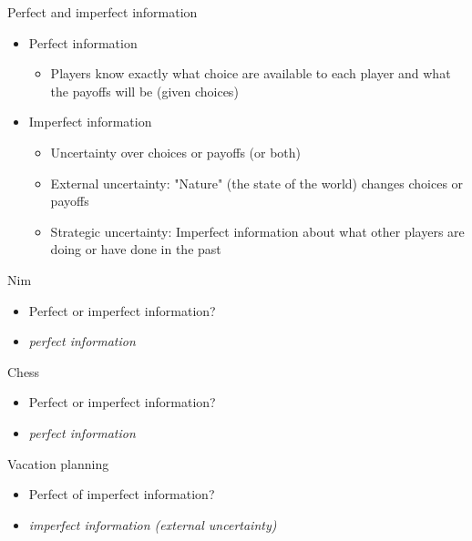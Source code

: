 \documentclass[10pt]{beamer}
\begin{document}
\begin{frame}[label={sec:orga606763}]{}
\alert{Perfect and imperfect information}
\begin{itemize}
\item Perfect information
\begin{itemize}
\item Players know exactly what choice are available to each player and what the payoffs will be (given choices)
\end{itemize}
\item Imperfect information
\begin{itemize}
\item Uncertainty over choices or payoffs (or both)
\item External uncertainty: "Nature" (the state of the world) changes choices or payoffs
\item Strategic uncertainty: Imperfect information about what other players are doing or have done in the past
\end{itemize}
\end{itemize}
\end{frame}

\begin{frame}[label={sec:org8154b02}]{}
\alert{Nim}
\begin{itemize}
\item Perfect or imperfect information?
\end{itemize}
\begin{itemize}
\item \emph{perfect information}
\end{itemize}
\end{frame}

\begin{frame}[label={sec:org79aff5f}]{}
\alert{Chess}
\begin{itemize}
\item Perfect or imperfect information?
\end{itemize}
\begin{itemize}
\item \emph{perfect information}
\end{itemize}
\end{frame}

\begin{frame}[label={sec:org02f0b6d}]{}
\alert{Vacation planning}
\begin{itemize}
\item Perfect of imperfect information?
\end{itemize}
\begin{itemize}
\item \emph{imperfect information (external uncertainty)}
\end{itemize}
\end{frame}
\end{document}
